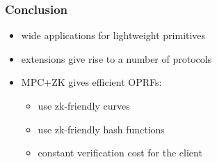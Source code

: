 \documentclass[10pt]{beamer}
\begin{document}
\begin{frame}
  \frametitle{Conclusion}
  \begin{itemize}
    \item wide applications for lightweight primitives
    \item extensions give rise to a number of protocols
    \item MPC+ZK gives efficient OPRFs: 
      \begin{itemize}
        \item use zk-friendly curves
        \item use zk-friendly hash functions
        \item \alert{constant} verification cost for the client 
      \end{itemize}
  \end{itemize}

\end{frame}
\end{document}

